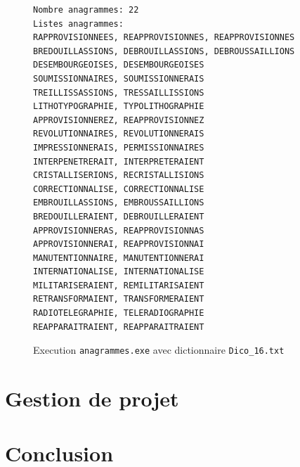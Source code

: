 \documentclass{article} %
\begin{document}
\begin{figure}[H]
  \begin{lstlisting}
Nombre anagrammes: 22
Listes anagrammes:
RAPPROVISIONNEES, REAPPROVISIONNES, REAPPROVISIONNES
BREDOUILLASSIONS, DEBROUILLASSIONS, DEBROUSSAILLIONS
DESEMBOURGEOISES, DESEMBOURGEOISES
SOUMISSIONNAIRES, SOUMISSIONNERAIS
TREILLISSASSIONS, TRESSAILLISSIONS
LITHOTYPOGRAPHIE, TYPOLITHOGRAPHIE
APPROVISIONNEREZ, REAPPROVISIONNEZ
REVOLUTIONNAIRES, REVOLUTIONNERAIS
IMPRESSIONNERAIS, PERMISSIONNAIRES
INTERPENETRERAIT, INTERPRETERAIENT
CRISTALLISERIONS, RECRISTALLISIONS
CORRECTIONNALISE, CORRECTIONNALISE
EMBROUILLASSIONS, EMBROUSSAILLIONS
BREDOUILLERAIENT, DEBROUILLERAIENT
APPROVISIONNERAS, REAPPROVISIONNAS
APPROVISIONNERAI, REAPPROVISIONNAI
MANUTENTIONNAIRE, MANUTENTIONNERAI
INTERNATIONALISE, INTERNATIONALISE
MILITARISERAIENT, REMILITARISAIENT
RETRANSFORMAIENT, TRANSFORMERAIENT
RADIOTELEGRAPHIE, TELERADIOGRAPHIE
REAPPARAITRAIENT, REAPPARAITRAIENT\end{lstlisting}
\caption{Execution \texttt{anagrammes.exe} avec dictionnaire \texttt{Dico\_16.txt}}
\label{fig:prog_3_1}
\end{figure}



\section{Gestion de projet}
\section{Conclusion}



\nocite{*}



\end{document}
